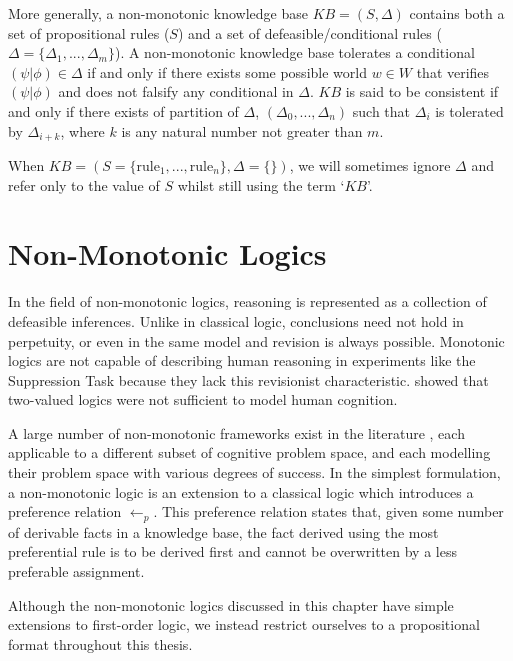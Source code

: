 More generally, a non-monotonic knowledge base $KB=(S, \Delta)$ contains both a set of propositional rules ($S$) and a set of defeasible/conditional rules ($\Delta=\{\Delta_1,...,\Delta_m\}$). A non-monotonic knowledge base tolerates a conditional $(\psi|\phi)\in\Delta$ if and only if there exists some possible world $w\in W$ that verifies $(\psi|\phi)$ and does not falsify any conditional in $\Delta$. $KB$ is said to be consistent if and only if there exists of partition of $\Delta$, $(\Delta_0,...,\Delta_n)$ such that $\Delta_i$ is tolerated by $\Delta_{i+k}$, where $k$ is any natural number not greater than $m$. 

When $KB=(S=\{\textrm{rule}_1,...,\textrm{rule}_n\},\Delta=\{\})$, we will sometimes ignore $\Delta$ and refer only to the value of $S$ whilst still using the term `$KB$'.
%




\section{Non-Monotonic Logics}
In the field of non-monotonic logics, reasoning is represented as a collection of defeasible inferences. Unlike in classical logic, conclusions need not hold in perpetuity, or even in the same model and revision is always possible. Monotonic logics are not capable of describing human reasoning in experiments like the Suppression Task \citep{dietz2012computational} because they lack this revisionist characteristic. \cite{ragni2016two} showed that two-valued logics were not sufficient to model human cognition.

A large number of non-monotonic frameworks exist in the literature \citep{mcdermott1980non}, each applicable to a different subset of cognitive problem space, and each modelling their problem space with various degrees of success. In the simplest formulation, a non-monotonic logic is an extension to a classical logic which introduces a preference relation $\leftarrow_p$. This preference relation states that, given some number of derivable facts in a knowledge base, the fact derived using the most preferential rule is to be derived first and cannot be overwritten by a less preferable assignment.  

Although the non-monotonic logics discussed in this chapter have simple extensions to first-order logic, we instead restrict ourselves to a propositional format throughout this thesis.
